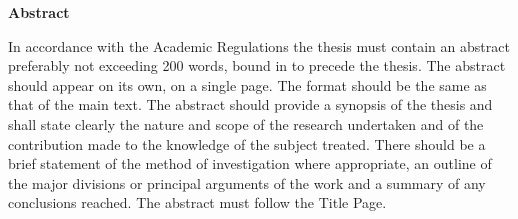 \begin{center}
\LARGE\textbf {Abstract}
\end{center}
\vspace{5pt}

\noindent
In accordance with the Academic Regulations the thesis must contain an abstract preferably not exceeding 200 words, bound in to precede the thesis. The abstract should appear on its own, on a single page.  The format should be the same as that of the main text. The abstract should provide a synopsis of the thesis and shall state clearly the nature and scope of the research undertaken and of the contribution made to the knowledge of the subject treated. There should be a brief statement of the method of investigation where appropriate, an outline of the major divisions or principal arguments of the work and a summary of any conclusions reached. The abstract must follow the Title Page.